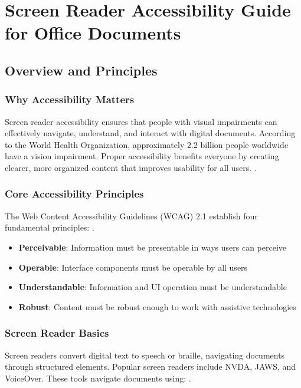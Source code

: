 \chapter{Screen Reader Accessibility Guide for Office Documents}
\label{chap:screenreader-office}

\section{Overview and Principles}
\label{sec:overview-principles}

\subsection{Why Accessibility Matters}
Screen reader accessibility ensures that people with visual impairments can effectively navigate, understand, and interact with digital documents. According to the World Health Organization, approximately 2.2 billion people worldwide have a vision impairment. Proper accessibility benefits everyone by creating clearer, more organized content that improves usability for all users.
 \cite{WHO2021}.

\subsection{Core Accessibility Principles}
The Web Content Accessibility Guidelines (WCAG) 2.1 establish four fundamental principles:
 \cite{WCAG2018}.

\begin{itemize}
\item \textbf{Perceivable}: Information must be presentable in ways users can perceive
\item \textbf{Operable}: Interface components must be operable by all users
\item \textbf{Understandable}: Information and UI operation must be understandable
\item \textbf{Robust}: Content must be robust enough to work with assistive technologies
\end{itemize}

\subsection{Screen Reader Basics}
Screen readers convert digital text to speech or braille, navigating documents through structured elements. Popular screen readers include NVDA, JAWS, and VoiceOver. These tools navigate documents using:
 \cite{NVDA2023, JAWS2023, VoiceOver2023}.

